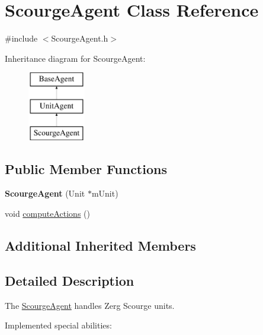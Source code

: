 \hypertarget{class_scourge_agent}{\section{Scourge\-Agent Class Reference}
\label{class_scourge_agent}
}


{\ttfamily \#include $<$Scourge\-Agent.\-h$>$}

Inheritance diagram for Scourge\-Agent\-:\begin{figure}[H]
\begin{center}
\leavevmode
\includegraphics[height=3.000000cm]{class_scourge_agent}
\end{center}
\end{figure}
\subsection*{Public Member Functions}
\begin{DoxyCompactItemize}
\item 
\hypertarget{class_scourge_agent_aefe50312896574757d58babaf10e18fa}{{\bfseries Scourge\-Agent} (Unit $\ast$m\-Unit)}\label{class_scourge_agent_aefe50312896574757d58babaf10e18fa}

\item 
void \hyperlink{class_scourge_agent_a99075a27d780c1e4af7314c3e8efc837}{compute\-Actions} ()
\end{DoxyCompactItemize}
\subsection*{Additional Inherited Members}


\subsection{Detailed Description}
The \hyperlink{class_scourge_agent}{Scourge\-Agent} handles Zerg Scourge units.

Implemented special abilities\-:
\begin{DoxyItemize}
\item 
\end{DoxyItemize}

